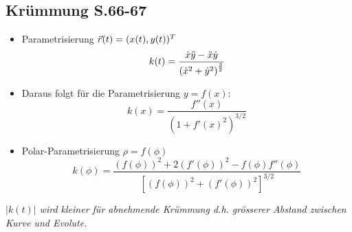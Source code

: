\subsection{Krümmung \texorpdfstring{\hfill S.66-67}{S.66-67}}
\vspace{3pt}

    \begin{itemize}
        \item Parametrisierung $\vec{r}(t) = (x(t),y(t))^T$
            $$
                k(t) = \frac{\dot{x} \ddot{y} - \ddot{x} \dot{y}}{\left( \dot{x}^2 + \dot{y}^2 \right)^{\frac{3}{2}}}
            $$
        \item Daraus folgt für die Parametrisierung $y = f(x)$:
        $$
            k(x)= \frac{f''(x)}{(1+f'(x)^2)^{3/2}}
        $$
        \item Polar-Parametrisierung $ \rho = f(\phi)$
            $$
                k(\phi) = \frac{(f(\phi))^2 + 2(f'(\phi))^2 - f(\phi) f''(\phi)}{[(f(\phi))^2 + (f'(\phi))^2]^{3/2}}
            $$
        
    \end{itemize}

    \vspace{5pt}
    
    \textit{$|k(t)|$ wird kleiner für abnehmende Krümmung d.h. grösserer Abstand zwischen Kurve und 
    Evolute.}